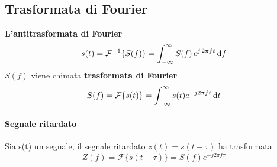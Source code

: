 \subsection{Trasformata di Fourier}
\textbf{L'antitrasformata di Fourier}
\begin{equation}
	s(t) = \mathcal{F}^{-1}\{S(f)\}= \int_{-\infty}^{\infty}S(f)\,e^{j\,2\pi ft}\,\mathrm{d} f
\end{equation}
$S(f)$ viene chimata \textbf{trasformata di Fourier}
\begin{equation}
	S(f) = \mathcal{F} \{s(t)\} = \int_{-\infty}^{\infty} s(t)e^{-j2\pi ft} \,\mathrm{d} t
\end{equation}
\paragraph{Segnale ritardato} Sia s(t) un segnale, il segnale ritardato $z(t) = s(t-\tau)$ ha trasformata
\begin{equation}\label{trasformata_segnale_ritardato}
	Z(f) = \mathcal{F}\{s(t-\tau)\} = S(f)e^{-j2\pi f\tau}
\end{equation}


